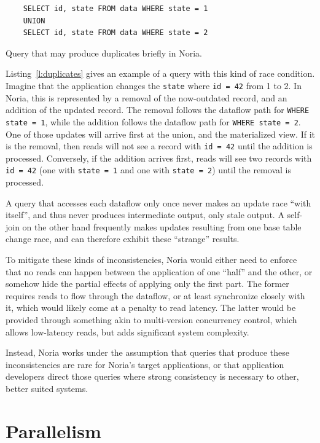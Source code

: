 \begin{listing}[h]
  \begin{verbatim}
    SELECT id, state FROM data WHERE state = 1
    UNION
    SELECT id, state FROM data WHERE state = 2
  \end{verbatim}
  \caption{Query that may produce duplicates briefly in Noria.}
  \label{l:duplicates}
\end{listing}

Listing~\vref{l:duplicates} gives an example of a query with this kind of race
condition. Imagine that the application changes the \texttt{state} where
\texttt{id = 42} from 1 to 2. In Noria, this is represented by a removal of the
now-outdated record, and an addition of the updated record. The removal follows
the dataflow path for \texttt{WHERE state = 1}, while the addition follows the
dataflow path for \texttt{WHERE state = 2}. One of those updates will arrive
first at the union, and the materialized view. If it is the removal, then reads
will not see a record with \texttt{id = 42} until the addition is processed.
Conversely, if the addition arrives first, reads will see two records with
\texttt{id = 42} (one with \texttt{state = 1} and one with \texttt{state = 2})
until the removal is processed.

A query that accesses each dataflow only once never makes an update race ``with
itself'', and thus never produces intermediate output, only stale output. A
self-join on the other hand frequently makes updates resulting from one base
table change race, and can therefore exhibit these ``strange'' results.

To mitigate these kinds of inconsistencies, Noria would either need to enforce
that no reads can happen between the application of one ``half'' and the other,
or somehow hide the partial effects of applying only the first part. The former
requires reads to flow through the dataflow, or at least synchronize closely
with it, which would likely come at a penalty to read latency. The latter would
be provided through something akin to multi-version concurrency control, which
allows low-latency reads, but adds significant system complexity.

Instead, Noria works under the assumption that queries that produce these
inconsistencies are rare for Noria's target applications, or that application
developers direct those queries where strong consistency is necessary to other,
better suited systems.

\section{Parallelism}
\label{s:parallel}

